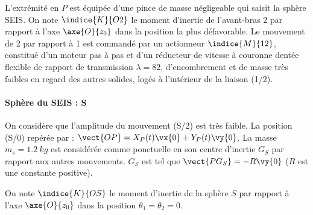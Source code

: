 L’extrémité en $P$ est équipée d’une pince de masse négligeable qui saisit la sphère SEIS. On note $\indice{K}{O2}$ le moment d'inertie de l'avant-bras 2 par rapport à l’axe $\axe{O}{z_0}$ dans la position la plus défavorable.  Le mouvement de 2 par rapport à 1 est commandé par un actionneur $\indice{M}{12}$, constitué d’un moteur pas à pas et d’un réducteur de vitesse à couronne dentée flexible de rapport de transmission $\lambda = 82$, d’encombrement et de masse très faibles en regard des autres solides, logés à l’intérieur de la liaison (1/2).


\paragraph*{Sphère du SEIS : S}
On considère que l’amplitude du mouvement (S/2) est très faible. La position (S/0) repérée par : $\vect{OP}= X_P(t) \vx{0} + Y_P(t) \vy{0} $. La masse $m_s = \SI{1,2}{kg}$ est considérée comme ponctuelle en son centre d’inertie $G_S$  par rapport aux autres mouvements. $G_S$  est tel que $\vect{PG_S} = -R \vy{0}$ ($R$ est une constante positive).

On note $\indice{K}{OS}$ le moment d'inertie de la sphère $S$ par rapport à l’axe $\axe{O}{z_0}$  dans la position $\theta_1 =\theta_2 = 0$.

